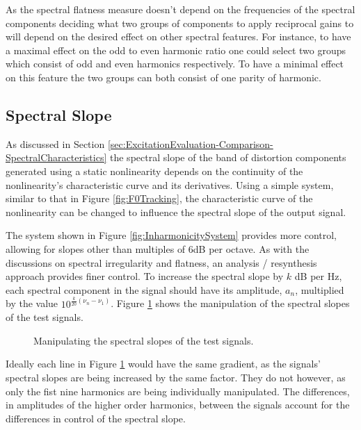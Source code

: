 		As the spectral flatness measure doesn't depend on the frequencies of the spectral components deciding what
		two groups of components to apply reciprocal gains to will depend on the desired effect on other spectral
		features. For instance, to have a maximal effect on the odd to even harmonic ratio one could select two
		groups which consist of odd and even harmonics respectively. To have a minimal effect on this feature the
		two groups can both consist of one parity of harmonic.

	\subsection{Spectral Slope}
	\label{sec:FeatureControl-Parameterisation-Slope}
		As discussed in Section \ref{sec:ExcitationEvaluation-Comparison-SpectralCharacteristics} the spectral
		slope of the band of distortion components generated using a static nonlinearity depends on the continuity
		of the nonlinearity's characteristic curve and its derivatives. Using a simple system, similar to that in
		Figure \ref{fig:F0Tracking}, the characteristic curve of the nonlinearity can be changed to influence the
		spectral slope of the output signal.

		The system shown in Figure \ref{fig:InharmonicitySystem} provides more control, allowing for slopes other
		than multiples of 6dB per octave. As with the discussions on spectral irregularity and flatness, an
		analysis / resynthesis approach provides finer control.  To increase the spectral slope by $k$ dB per Hz,
		each spectral component in the signal should have its amplitude, $a_{n}$, multiplied by the value
		$10^{\frac{k}{20}(\nu_{n} - \nu_{1})}$. Figure \ref{fig:MoveSlopes} shows the manipulation of the spectral
		slopes of the test signals.

		\begin{figure}[h!]
			\centering
			\resizebox{0.6\textwidth}{!}{}
			\caption{Manipulating the spectral slopes of the test signals.}
			\label{fig:MoveSlopes}
		\end{figure}

		Ideally each line in Figure \ref{fig:MoveSlopes} would have the same gradient, as the signals' spectral
		slopes are being increased by the same factor. They do not however, as only the fist nine harmonics are
		being individually manipulated. The differences, in amplitudes of the higher order harmonics, between the
		signals account for the differences in control of the spectral slope.


